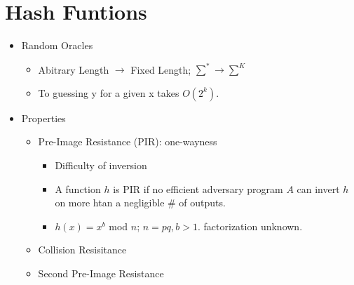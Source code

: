 \section{Hash Funtions}
\begin{itemize}
\item Random Oracles
    \begin{itemize}
    \item Abitrary Length $\rightarrow$ Fixed Length; $\sum^* \rightarrow \sum^K$
    \item To guessing y for a given x takes $O(2^k)$.
    \end{itemize}
\item Properties
    \begin{itemize}
    \item Pre-Image Resistance (PIR): one-wayness
        \begin{itemize}
        \item Difficulty of inversion
        \item A function $h$ is PIR if no efficient adversary program $A$ can invert $h$ on more htan a negligible # of outputs.
        \item $h(x) = x^b$ mod $n$; $n=pq, b>1$. factorization unknown.
        \end{itemize}
    \item Collision Resisitance
    \item Second Pre-Image Resistance
    \end{itemize}
\end{itemize}